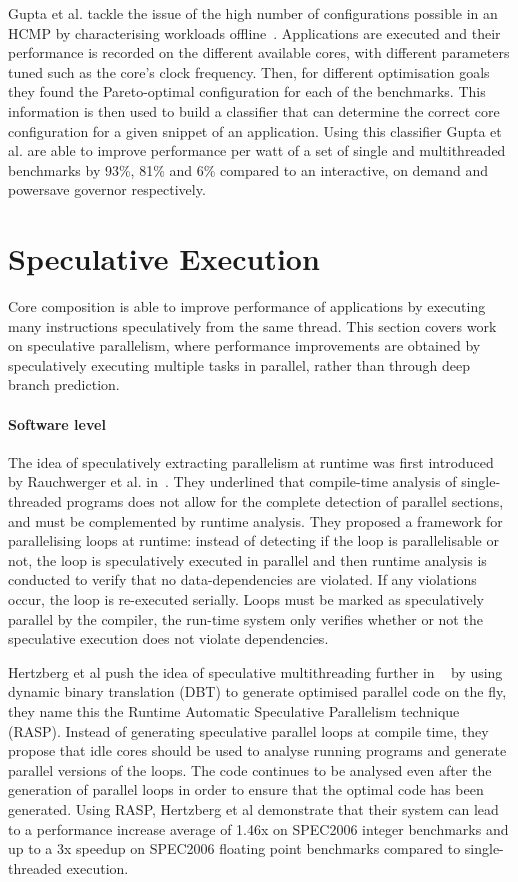 Gupta et al. tackle the issue of the high number of configurations possible in an HCMP by characterising workloads offline~\cite{Gupta2017Dypo}.
Applications are executed and their performance is recorded on the different available cores, with different parameters tuned such as the core's clock frequency.
Then, for different optimisation goals they found the Pareto-optimal configuration for each of the benchmarks.
This information is then used to build a classifier that can determine the correct core configuration for a given snippet of an application.
Using this classifier Gupta et al. are able to improve performance per watt of a set of single and multithreaded benchmarks by 93\%, 81\% and 6\% compared to an interactive, on demand and powersave governor respectively.

\section{Speculative Execution}
Core composition is able to improve performance of applications by executing many instructions speculatively from the same thread.
This section covers work on speculative parallelism, where performance improvements are obtained by speculatively executing multiple tasks in parallel, rather than through deep branch prediction.

\paragraph*{Software level}
The idea of speculatively extracting parallelism at runtime was first introduced by Rauchwerger et al. in~\cite{runtimeSpec}.
They underlined that compile-time analysis of single-threaded programs does not allow for the complete detection of parallel sections, and must be complemented by runtime analysis.
They proposed a framework for parallelising loops at runtime: instead of detecting if the loop is parallelisable or not, the loop is speculatively executed in parallel and then runtime analysis is conducted to verify that no data-dependencies are violated.
If any violations occur, the loop is re-executed serially.
Loops must be marked as speculatively parallel by the compiler, the run-time system only verifies whether or not the speculative execution does not violate dependencies.

Hertzberg et al push the idea of speculative multithreading further in ~\cite{dbtspec2011} by using dynamic binary translation (DBT) to generate optimised parallel code on the fly, they name this the Runtime Automatic Speculative Parallelism technique (RASP).
Instead of generating speculative parallel loops at compile time, they propose that idle cores should be used to analyse running programs and generate parallel versions of the loops.
The code continues to be analysed even after the generation of parallel loops in order to ensure that the optimal code has been generated.
Using RASP, Hertzberg et al demonstrate that their system can lead to a performance increase average of 1.46x on SPEC2006 integer benchmarks and up to a 3x speedup on SPEC2006 floating point benchmarks compared to single-threaded execution.

